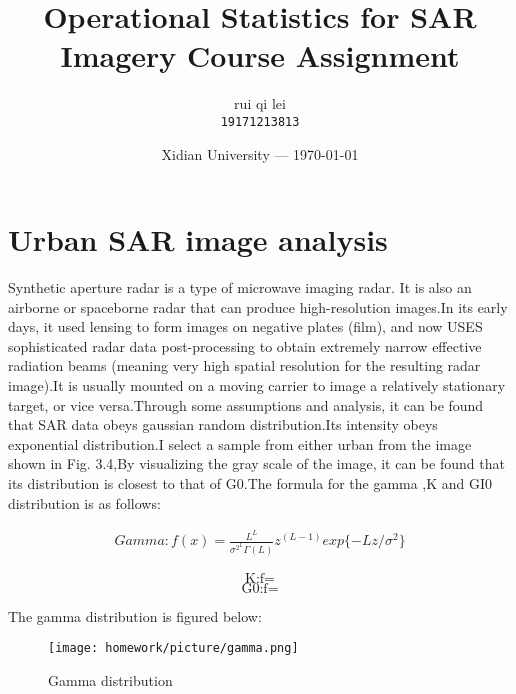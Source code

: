 \documentclass{article}
\title{Operational Statistics for SAR Imagery Course Assignment} %
\author{rui qi lei\\ \texttt{19171213813}} %
\date{Xidian University --- \today} %
\begin{document}
	
	\maketitle %
	
	\section*{Urban SAR image analysis} %
	\par Synthetic aperture radar is a type of microwave imaging radar. It is also an airborne or spaceborne radar that can produce high-resolution images.In its early days, it used lensing to form images on negative plates (film), and now USES sophisticated radar data post-processing to obtain extremely narrow effective radiation beams (meaning very high spatial resolution for the resulting radar image).It is usually mounted on a moving carrier to image a relatively stationary target, or vice versa.Through some assumptions and analysis, it can be found that SAR data obeys gaussian random distribution.Its intensity obeys exponential distribution.I select a sample from either urban from the image shown in Fig. 3.4,By visualizing the gray scale of the image, it can be found that its distribution is closest to that of G0.The formula for the gamma ,K and GI0 distribution is as follows:
	
	\begin{eqnarray}
	Gamma:f(x)=\frac{L^L}{\sigma^{2^L}\Gamma(L)}z^(L-1)exp{\lbrace{-Lz}/\sigma^2\rbrace}
	\end{eqnarray}
	
	\begin{equation}
	\mathop {K:f(x)=\frac{2\lambda L}{\Gamma(\alpha)\Gamma(L)}(\lambda Lz)^{\frac{\alpha+L}{2}-1}K_{\alpha-L}(2\sqrt{\lambda Lz})}
	\end{equation}
	\begin{equation}
	\mathop {G0:f(x)=\frac{L^L\Gamma(L-\alpha)}{\gamma^\alpha\Gamma(L)\Gamma(-\alpha)}\frac{z^{L-1}}{{(\gamma+Lz)}^{L-\alpha}}}
	\end{equation}
	\par The gamma distribution is figured below:
	\begin{figure}[h] %
		\centering
		\texttt{[image: homework/picture/gamma.png]}
		\caption{Gamma distribution}
	\end{figure}
	
\end{document}
